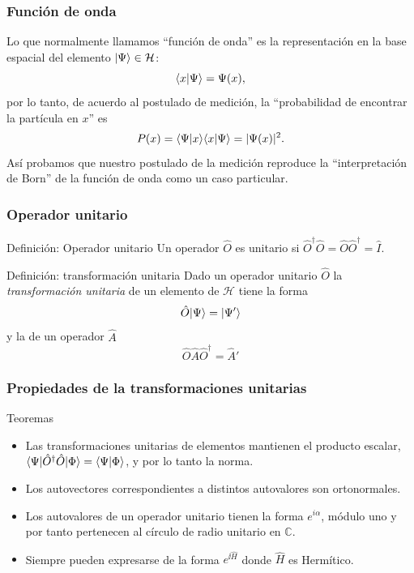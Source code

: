 \documentclass{beamer}
\begin{document}
\begin{frame}
    \frametitle{Función de onda}
    Lo que normalmente llamamos ``función de onda'' es la representación en la base espacial del elemento $| \Psi \rangle\in\mathcal{H}$:
    $$\langle x | \Psi \rangle=\Psi(x),$$
    por lo tanto, de acuerdo al postulado de medición, la ``probabilidad de encontrar la partícula en $x$'' es
    $$P(x)=\langle \Psi | x \rangle\langle x | \Psi \rangle = |\Psi(x)|^2.$$
    Así probamos que nuestro postulado de la medición reproduce la ``interpretación de Born'' de la función de onda como un caso particular.
\end{frame}

\begin{frame}
    \frametitle{Operador unitario}
    \begin{block}{Definición: Operador unitario}
        Un operador $\hat{O}$ es unitario si $\hat{O}^\dagger\hat{O}=\hat{O}\hat{O}^\dagger=\hat{I}$.
    \end{block}    

    \begin{block}{Definición: transformación unitaria}
        Dado un operador unitario $\hat{O}$ la {\em transformación unitaria} de un elemento de $\mathcal{H}$ tiene la forma
        \[\hat{O}| \Psi \rangle=| \Psi' \rangle\]
        y la de un operador $\hat{A}$
        \[\hat{O}\hat{A}\hat{O}^\dagger=\hat{A}'\]
    \end{block}
\end{frame}

\begin{frame}
    \frametitle{Propiedades de la transformaciones unitarias}
    \begin{block}{Teoremas}
        \begin{itemize}
            \item Las transformaciones unitarias de elementos mantienen el producto escalar, $\langle \Psi |\hat{O}^\dagger \hat{O}| \Phi \rangle=\langle \Psi | \Phi \rangle$, y por lo tanto la norma.
            \item Los autovectores correspondientes a distintos autovalores son ortonormales.
            \item Los autovalores de un operador unitario tienen la forma $e^{i\alpha}$, módulo uno y por tanto pertenecen al círculo de radio unitario en $\mathbb{C}$.
            \item Siempre pueden expresarse de la forma $e^{\ii \hat{H}}$ donde $\hat{H}$ es Hermítico.
        \end{itemize}

    \end{block}

\end{frame}
\end{document}

